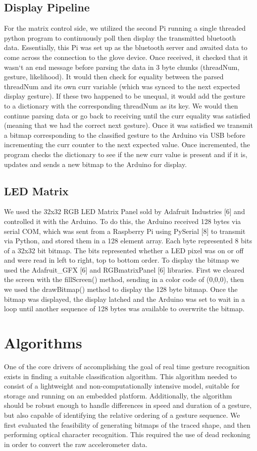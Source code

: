 \documentclass{sig-alternate-05-2015}
\begin{document}
\subsection{Display Pipeline}
For the matrix control side, we utilized the second Pi running a single threaded python program to continuously poll then display the transmitted bluetooth data. Essentially, this Pi was set up as the bluetooth server and awaited data to come across the connection to the glove device. Once received, it checked that it wasn`t an end message before parsing the data in 3 byte chunks (threadNum, gesture, likelihood). It would then check for equality between the parsed threadNum and its own curr variable (which was synced to the next expected display gesture). If these two happened to be unequal, it would add the gesture to a dictionary with the corresponding threadNum as its key. We would then continue parsing data or go back to receiving until the curr equality was satisfied (meaning that we had the correct next gesture). Once it was satisfied we transmit a bitmap corresponding to the classified gesture to the Arduino via USB before incrementing the curr counter to the next expected value. Once incremented, the program checks the dictionary to see if the new curr value is present and if it is, updates and sends a new bitmap to the Arduino for display.

\subsection{LED Matrix}
We used the 32x32 RGB LED Matrix Panel sold by Adafruit Industries [6] and controlled it with the Arduino. To do this, the Arduino received 128 bytes via serial COM, which was sent from a Raspberry Pi using PySerial [8] to transmit via Python, and stored them in a 128 element array. Each byte represented 8 bits of a 32x32 bit bitmap. The bits represented whether a LED pixel was on or off and were read in left to right, top to bottom order. To display the bitmap we used the Adafruit\_GFX [6] and RGBmatrixPanel [6] libraries. First we cleared the screen with the fillScreen() method, sending in a color code of (0,0,0), then we used the drawBitmap() method to display the 128 byte bitmap. Once the bitmap was displayed, the display latched and the Arduino was set to wait in a loop until another sequence of 128 bytes was available to overwrite the bitmap.

\section{Algorithms}
One of the core drivers of accomplishing the goal of real time gesture recognition exists in finding a suitable classification algorithm. This algorithm needed to consist of a lightweight and non-computationally intensive model, suitable for storage and running on an embedded platform. Additionally, the algorithm should be robust enough to handle differences in speed and duration of a gesture, but also capable of identifying the relative ordering of a gesture sequence. We first evaluated the feasibility of generating bitmaps of the traced shape, and then performing optical character recognition. This required the use of dead reckoning in order to convert the raw accelerometer data.
\end{document}
